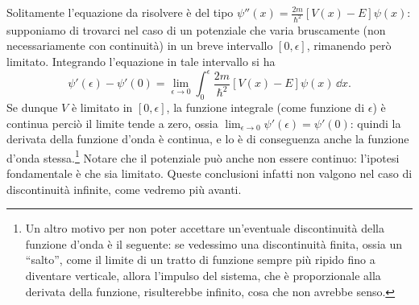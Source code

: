 Solitamente l'equazione da risolvere è del tipo $\psi''(x)=\frac{2m}{\hbar^2}[V(x)-E]\psi(x)$: supponiamo di trovarci nel caso di un potenziale che varia bruscamente (non necessariamente con continuità) in un breve intervallo $[0,\epsilon]$, rimanendo però limitato.
Integrando l'equazione in tale intervallo si ha
\begin{equation}
	\psi'(\epsilon)-\psi'(0)=\lim_{\epsilon\to 0}\int_0^\epsilon\frac{2m}{\hbar^2}[V(x)-E]\psi(x)\,\dd x.
\end{equation}
Se dunque $V$ è limitato in $[0,\epsilon]$, la funzione integrale (come funzione di $\epsilon$) è continua perciò il limite tende a zero, ossia $\lim_{\epsilon\to 0}\psi'(\epsilon)=\psi'(0)$: quindi la derivata della funzione d'onda è continua, e lo è di conseguenza anche la funzione d'onda stessa.\footnote{Un altro motivo per non poter accettare un'eventuale discontinuità della funzione d'onda è il seguente: se vedessimo una discontinuità finita, ossia un ``salto'', come il limite di un tratto di funzione sempre più ripido fino a diventare verticale, allora l'impulso del sistema, che è proporzionale alla derivata della funzione, risulterebbe infinito, cosa che non avrebbe senso.}
Notare che il potenziale può anche non essere continuo: l'ipotesi fondamentale è che sia limitato.
Queste conclusioni infatti non valgono nel caso di discontinuità infinite, come vedremo più avanti.

